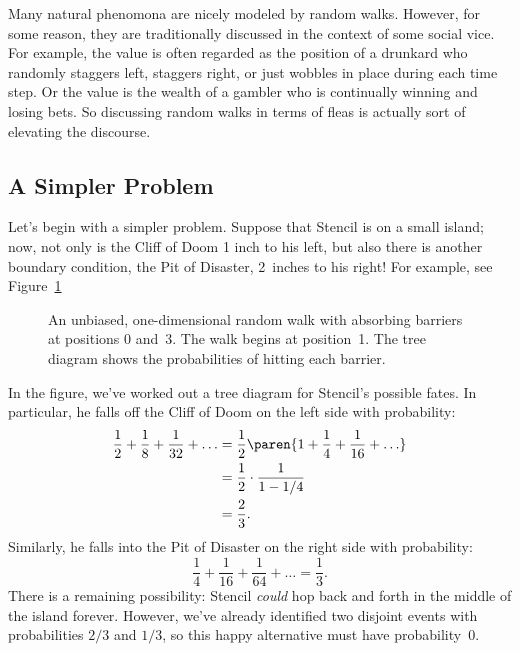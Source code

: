 Many natural phenomona are nicely modeled by random walks.  However,
for some reason, they are traditionally discussed in the context of
some social vice.  For example, the value is often regarded as the
position of a drunkard who randomly staggers left, staggers right, or
just wobbles in place during each time step.  Or the value is the
wealth of a gambler who is continually winning and losing bets.  So
discussing random walks in terms of fleas is actually sort of
elevating the discourse.

\subsection{A Simpler Problem}

Let's begin with a simpler problem.  Suppose that Stencil is on a
small island; now, not only is the Cliff of Doom 1 inch to his left,
but also there is another boundary condition, the Pit of Disaster,
2~inches to his right!  For example, see Figure~\ref{fig:19P1}

\begin{figure}



\caption{An unbiased, one-dimensional random walk with absorbing
  barriers at positions 0 and~3.  The walk begins at position~1.  The
  tree diagram shows the probabilities of hitting each barrier.}

\label{fig:19P1}

\end{figure}

In the figure, we've worked out a tree diagram for Stencil's possible
fates.  In particular, he falls off the Cliff of Doom on the left side
with probability:
%
\begin{align*}
\frac{1}{2} + \frac{1}{8} + \frac{1}{32} + \ldots
    & = \frac{1}{2} \paren{1 + \frac{1}{4} + \frac{1}{16} + \ldots} \\
    & = \frac{1}{2} \cdot \frac{1}{1 - 1/4} \\
    & = \frac{2}{3}.
\end{align*}
%
Similarly, he falls into the Pit of Disaster on the right side with
probability:
%
\[
\frac{1}{4} + \frac{1}{16} + \frac{1}{64} + \ldots = \frac{1}{3}.
\]
%
There is a remaining possibility: Stencil \emph{could} hop back and
forth in the middle of the island forever.  However, we've already
identified two disjoint events with probabilities $2/3$ and $1/3$, so
this happy alternative must have probability~0.

